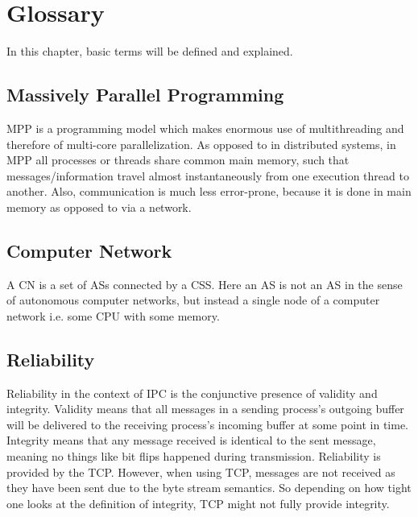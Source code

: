 \section{Glossary}

In this chapter, basic terms will be defined and explained.

\subsection{Massively Parallel Programming}

\acf{MPP} is a programming model which makes enormous use of multithreading and therefore of multi-core parallelization. As opposed to in distributed systems, in \ac{MPP} all processes or threads share common main memory, such that messages/information travel almost instantaneously from one execution thread to another. Also, communication is much less error-prone, because it is done in main memory as opposed to via a network.

\subsection{Computer Network}

A \ac{CN} is a set of \acp{AS} connected by a \ac{CSS}. Here an \ac{AS} is not an \ac{AS} in the sense of autonomous computer networks, but instead a single node of a computer network i.e. some CPU with some memory.

\subsection{Reliability}

Reliability in the context of \ac{IPC} is the conjunctive presence of validity and integrity. Validity means that all messages in a sending process's outgoing buffer will be delivered to the receiving process's incoming buffer at some point in time. Integrity means that any message received is identical to the sent message, meaning no things like bit flips happened during transmission. Reliability is provided by the \ac{TCP}. However, when using \ac{TCP}, messages are not received as they have been sent due to the byte stream semantics. So depending on how tight one looks at the definition of integrity, \ac{TCP} might not fully provide integrity.